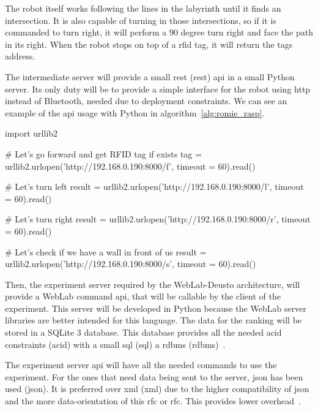 The robot itself works following the lines in the labyrinth until it finds an intersection. It is
also capable of turning in those intersections, so if it is commanded to turn right, it will perform
a 90 degree turn right and face the path in its right. When the robot stops on top of a
\acrshort{rfid} tag, it will return the tags address.

The intermediate server will provide a small \acrlong{rest} (\acrshort{rest}) \acrshort{api} in a
small Python server. Its only duty will be to provide a simple interface for the robot using
\acrshort{http} instead of Bluetooth, needed due to deployment constraints. We can see an example of
the \acrshort{api} usage with Python in algorithm~\ref{alg:romie_rasp}.

\begin{center}
\begin{minipage}{.9\textwidth}
\singlespace
\begin{pyglist}[language=python, caption={Romie \acrshort{rest} \acrshort{api} example.},
	label={alg:romie_rasp}, listingname={Algorithm}, numbers=left]
import urllib2

# Let's go forward and get RFID tag if exists
tag = urllib2.urlopen('http://192.168.0.190:8000/f', timeout = 60).read()

# Let's turn left
result = urllib2.urlopen('http://192.168.0.190:8000/l', timeout = 60).read()

# Let's turn right
result = urllib2.urlopen('http://192.168.0.190:8000/r', timeout = 60).read()

# Let's check if we have a wall in front of us
result = urllib2.urlopen('http://192.168.0.190:8000/s', timeout = 60).read()
\end{pyglist}
\end{minipage}
\end{center}

Then, the experiment server required by the WebLab-Deusto architecture, will provide a WebLab
command \acrshort{api}, that will be callable by the client of the experiment. This server will be
developed in Python because the WebLab server libraries are better intended for this language. The
data for the ranking will be stored in a SQLite 3 database. This database provides all the needed
\acrshort{acid} constraints (\acrlong{acid}) with a small \acrshort{sql} (\acrlong{sql}) a
\acrlong{rdbms} (\acrshort{rdbms})~\cite{sqlite}.

The experiment server \acrshort{api} will have all the needed commands to use the experiment. For
the ones that need data being sent to the server, \acrshort{json} has been used (\acrlong{json}). It
is preferred over \acrshort{xml} (\acrlong{xml}) due to the higher compatibility of \acrshort{json}
and the more data-orientation of this \acrlong{rfc} or \acrshort{rfc}. This provides lower
overhead~\cite{xml_vs_json}.

